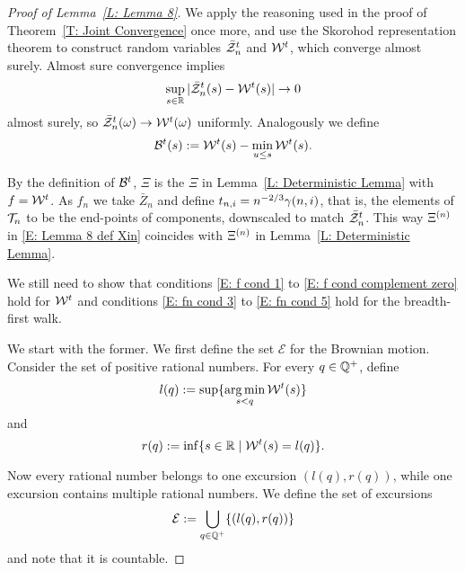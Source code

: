 \begin{proof}[Proof of Lemma~\ref{L: Lemma 8}]
	We apply the reasoning used in the proof of Theorem~\ref{T: Joint Convergence} once more,
	and use the Skorohod representation theorem to construct random variables
	$\bar{\mathcal{Z}}^t_n$ and $\mathcal{W}^t$,
	which converge almost surely.
	Almost sure convergence implies
	\begin{equation}
	\sup_{s \in \mathbb{R}}|\bar{\mathcal{Z}}^t_n(s) - \mathcal{W}^t(s)| \rightarrow 0
	\end{equation}
	almost surely,
	so $\bar{\mathcal{Z}}^t_n(\omega) \rightarrow \mathcal{W}^t(\omega)$ uniformly.
	Analogously we define
	\begin{equation}
		\mathcal{B}^t(s) := \mathcal{W}^t(s) - \min_{u \leq s}\mathcal{W}^t(s).
	\end{equation}
	
	By the definition of $\mathcal{B}^t$, 
	$\Xi$ is the $\Xi$ in Lemma~\ref{L: Deterministic Lemma} with $f = \mathcal{W}^t$.
	As $f_n$ we take $\bar{Z}_n$ and define $t_{n, i} = n^{-2 / 3} \gamma(n,i)$, that is, 
	the elements of $\mathcal{T}_n$ to be the end-points of components,
	downscaled to match $\bar{\mathcal{Z}}^t_n$.
	This way $\Xi^{(n)}$ in \eqref{E: Lemma 8 def Xin} coincides with $\Xi^{(n)}$ in Lemma~\ref{L: Deterministic Lemma}.
	
	We still need to show that conditions \eqref{E: f cond 1} to \eqref{E: f cond complement zero} hold for $\mathcal{W}^t$
	and conditions \eqref{E: fn cond 3} to \eqref{E: fn cond 5} hold for the breadth-first walk.
	
	We start with the former. 
	We first define the set $\mathcal{E}$ for the Brownian motion.
	Consider the set of positive rational numbers.
	For every $q \in \mathbb{Q}^+$, 
	define 
	\begin{equation}
		l(q) := \sup\{ \operatorname*{arg\,min}_{s < q} \mathcal{W}^t(s) \}
	\end{equation}
	and
	\begin{equation}
		r(q) := \inf\{ {s \in \mathbb{R} \; | \; \mathcal{W}^t(s) = l(q)} \}.
	\end{equation}
	
	Now every rational number belongs to one excursion $(l(q), r(q))$,
	while one excursion contains multiple rational numbers.
	We define the set of excursions
	\begin{equation}
	\mathcal{E} := \bigcup_{q \in \mathbb{Q}^+} \{ (l(q), r(q)) \}
	\end{equation}
	and note that it is countable.
	

\end{proof}

